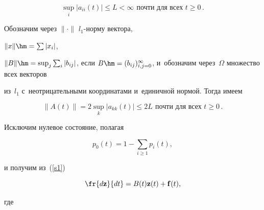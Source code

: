         \begin{equation*}

            \sup\limits_i|a_{ii}\left(t\right)| \le  L < \infty\ \, \mbox{почти\ для\ всех } t \ge 0\,.


        \end{equation*}

        

        Обозначим через $ \|\cdot\| $ $ l_1 $-норму вектора, 

$\|{x}\|\hm=\sum|x_i|$,

        $\|B\| \hm= \sup\nolimits_j \sum\nolimits_i |b_{ij}|$, если $B\hm = 

(b_{ij})_{i,j=0}^{\infty}$, и~обозначим через~$\Omega $ множество всех векторов 

из~$l_1$ с~не\-от\-ри\-ца\-тель\-ны\-ми координатами и~единичной нормой. Тогда имеем 

$$

\|A(t)\| = 2\sup\limits_{k}\left|a_{kk}\left(t\right)\right| \le 2L

\ \, \mbox{почти\ для\ всех } t \ge 0\,.

$$

        

Исключим нулевое состояние, полагая

$$

p_0\left( t\right) =1-\sum\limits_{i\geq 1}p_i\left( t\right),

$$

и получим из~(\ref{s1})



\noindent

\begin{equation}

\label{eq_4}

\fr{d\mathbf{z}}{dt}=B(t)\mathbf{z}(t)+\mathbf{f}(t),

\end{equation}



\vspace*{-1pt}



\noindent

где



\vspace*{-5pt}



\noindent

